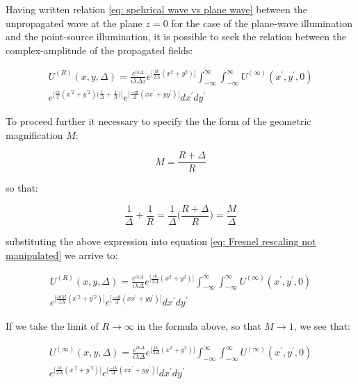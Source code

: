 \documentclass{iucr}              %
\begin{document}
Having written relation \ref{eq: spehrical wave vs plane wave} between the unpropagated wave at the plane $z=0$ for the case of the plane-wave illumination and the point-source illumination, it is possible to seek the relation between the complex-amplitude of the propagated fields:

\begin{multline}\label{eq: Fresnel rescaling not manipulated}
U^{(R)}(x, y, \Delta)=\frac {e^{ik\Delta}}{ i \lambda \Delta z} e^{\big[\frac{ik}{2\Delta}(x^2+y^2)\big]} \int_{-\infty}^{\infty} \int_{-\infty}^{\infty} U^{(\infty)}(x^\prime, y^\prime, 0)\\
e^{\big[\frac{ik}{2}(x^{\prime 2}+y^{\prime 2})\big(\frac{1}{\Delta}+\frac{1}{R}\big)\big]}e^{\big[\frac{-ik}{\Delta}(xx^{\prime}+yy^{\prime})\big]} dx^\prime dy^\prime
\end{multline}

To proceed further it necessary to specify the the form of the geometric magnification $M$:

\begin{equation}
	M= \frac{R+\Delta}{R}
\end{equation} 

so that:

\begin{equation}
	\frac{1}{\Delta}+\frac{1}{R} = \frac{1}{\Delta}\Big(\frac{R+\Delta}{R}\Big)=\frac{M}{\Delta}
\end{equation}

substituting the above expression into equation \ref{eq: Fresnel rescaling not manipulated} we arrive to:

\begin{multline}\label{eq: Fresnel rescaling with M}
U^{(R)}(x, y, \Delta)=\frac {e^{ik\Delta}}{ i \lambda \Delta} e^{\big[\frac{ik}{2\Delta}(x^2+y^2)\big]} \int_{-\infty}^{\infty} \int_{-\infty}^{\infty} U^{(\infty)}(x^\prime, y^\prime, 0)\\
e^{\big[\frac{ikM}{2\Delta}(x^{\prime 2}+y^{\prime 2})\big]}e^{\big[\frac{-ik}{\Delta}(xx^{\prime}+yy^{\prime})\big]} dx^\prime dy^\prime
\end{multline}

If we take the limit of $R\rightarrow\infty$ in the formula above, so that $M\rightarrow 1$, we see that:

\begin{multline}\label{eq: Fresnel rescaling with M=1}
U^{(\infty)}(x, y, \Delta)=\frac {e^{ik\Delta}}{ i \lambda \Delta} e^{\big[\frac{ik}{2\Delta}(x^2+y^2)\big]} \int_{-\infty}^{\infty} \int_{-\infty}^{\infty} U^{(\infty)}(x^\prime, y^\prime, 0)\\
e^{\big[\frac{ik}{2\Delta}(x^{\prime 2}+y^{\prime 2})\big]}e^{\big[\frac{-ik}{\Delta}(xx^{\prime}+yy^{\prime})\big]} dx^\prime dy^\prime
\end{multline}
\end{document}
